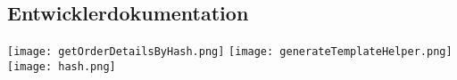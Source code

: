 \subsection{Entwicklerdokumentation}
\label{app:Doc}

\texttt{[image: getOrderDetailsByHash.png]}
\texttt{[image: generateTemplateHelper.png]}
\texttt{[image: hash.png]}